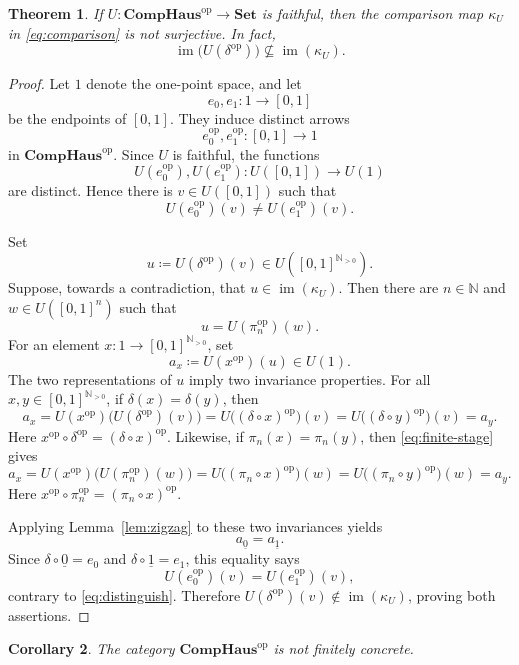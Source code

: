 \documentclass[11pt]{amsart}
\newcommand{\CompHaus}{\mathbf{CompHaus}}
\newcommand{\Set}{\mathbf{Set}}
\newcommand{\N}{\mathbb N}
\newcommand{\op}{\mathrm{op}}
\newcommand{\im}{\operatorname{im}}
\newtheorem{theorem}{Theorem}[section]
\newtheorem{corollary}[theorem]{Corollary}
\theoremstyle{definition}
\theoremstyle{remark}
\begin{document}
\begin{theorem}\label{thm:main}
If \(U\colon\CompHaus^{\op}\to\Set\) is faithful, then the comparison map
\(\kappa_U\) in \eqref{eq:comparison} is not surjective.  In fact,
\[
  \im\bigl(U(\delta^{\op})\bigr)\nsubseteq\im(\kappa_U).
\]
\end{theorem}

\begin{proof}
Let \(1\) denote the one-point space, and let
\[
  e_0,e_1\colon 1\longrightarrow [0,1]
\]
be the endpoints of \([0,1]\).  They induce distinct arrows
\[
  e_0^{\op},e_1^{\op}\colon [0,1]\longrightarrow 1
\]
in \(\CompHaus^{\op}\).  Since \(U\) is faithful, the functions
\[
  U(e_0^{\op}),U(e_1^{\op})\colon U([0,1])\longrightarrow U(1)
\]
are distinct.  Hence there is \(v\in U([0,1])\) such that
\begin{equation}\label{eq:distinguish}
  U(e_0^{\op})(v)\neq U(e_1^{\op})(v).
\end{equation}

Set
\[
  u \coloneqq U(\delta^{\op})(v)\in U([0,1]^{\N_{>0}}).
\]
Suppose, towards a contradiction, that \(u\in\im(\kappa_U)\).  Then there
are \(n\in\N\) and \(w\in U([0,1]^n)\) such that
\begin{equation}\label{eq:finite-stage}
  u=U(\pi_n^{\op})(w).
\end{equation}
For an element $x \colon 1 \to [0,1]^{\N_{>0}}$, set
\[
  a_x \coloneqq U(x^{\op})(u)\in U(1).
\]
The two representations of \(u\) imply two invariance properties. 
For all $x,y \in [0,1]^{\N_{>0}}$, if
\(\delta(x)=\delta(y)\), then
\[
  a_x =U(x^{\op})\bigl(U(\delta^{\op})(v)\bigr) =U\bigl((\delta\circ x)^{\op}\bigr)(v) =U\bigl((\delta\circ y)^{\op}\bigr)(v) = a_y.
\]
Here \(x^{\op}\circ \delta^{\op}=(\delta\circ x)^{\op}\).  Likewise, if
\(\pi_n(x)=\pi_n(y)\), then \eqref{eq:finite-stage} gives
\[
 a_x =U(x^{\op})\bigl(U(\pi_n^{\op})(w)\bigr)=U\bigl((\pi_n\circ x)^{\op}\bigr)(w) =U\bigl((\pi_n\circ y)^{\op}\bigr)(w) = a_y.
\]
Here \(x^{\op}\circ\pi_n^{\op}=(\pi_n\circ x)^{\op}\).

Applying Lemma~\ref{lem:zigzag} to these two invariances yields
\[
  a_{\underline 0}
  = a_{\underline 1}.
\]
Since \(\delta\circ\underline 0=e_0\) and
\(\delta\circ\underline 1=e_1\), this equality says
\[
  U(e_0^{\op})(v)=U(e_1^{\op})(v),
\]
contrary to \eqref{eq:distinguish}.  Therefore
\(U(\delta^{\op})(v)\notin\im(\kappa_U)\), proving both assertions.
\end{proof}

\begin{corollary}\label{cor:not-fc}
The category \(\CompHaus^{\op}\) is not finitely concrete.
\end{corollary}
\end{document}
